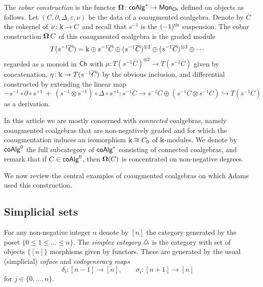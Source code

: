 The \textit{cobar construction} is the functor $\operatorname{\mathbf{\Omega}} \colon \mathsf{coAlg}^* \to \mathsf{Mon}_{\mathsf{Ch}}$ defined on objects as follows.
Let $(C, \partial, \Delta, \varepsilon, \nu)$ be the data of a coaugmented coalgebra.
Denote by $\overline{C}$ the cokernel of $\nu \colon \Bbbk \to C$ and recall that $s^{-1}$ is the $(-1)^\mathrm{th}$ suspension.
The cobar construction $\operatorname{\mathbf{\Omega}} C$ of this coaugmented coalgebra is the graded module
\begin{equation*}
T(s^{-1} \overline{C}) = \Bbbk \oplus s^{-1}\overline{C} \oplus (s^{-1}\overline{C})^{\otimes 2} \oplus (s^{-1}\overline{C})^{\otimes 3} \oplus \cdots
\end{equation*}
regarded as a monoid in $\mathsf{Ch}$ with $\mu \colon T(s^{-1} \overline{C})^{\otimes 2} \to T(s^{-1} \overline{C})$ given by concatenation, $\eta \colon \Bbbk \to T(s^{-1} \overline{C})$ by the obvious inclusion, and differential constructed by extending the linear map
\begin{equation*}
- s^{-1} \circ \partial \circ s^{+1} \ + \ (s^{-1} \otimes s^{-1}) \circ \Delta \circ s^{+1} \colon
s^{-1} \overline{C} \to s^{-1}\overline{C} \oplus (s^{-1}\overline{C} \otimes s^{-1}\overline{C}) \hookrightarrow T(s^{-1}C)
\end{equation*}
as a derivation.

In this article we are mostly concerned with \textit{connected} coalgebras, namely coaugmented  coalgebras that are non-negatively graded and for which the coaugmentation induces an isomorphism $\Bbbk \cong C_0$ of $\Bbbk$-modules. We denote by $\mathsf{coAlg}^0$ the full subcategory of $\mathsf{coAlg}^*$ consisting of connected coalgebras, and remark that if $C \in \mathsf{coAlg}^0$, then $ \operatorname{\mathbf{\Omega}}(C)$ is concentrated on non-negative degrees.

We now review the central examples of coaugmented coalgebras on which Adams used this construction.

\subsection{Simplicial sets}

For any non-negative integer $n$ denote by $[n]$ the category generated by the poset $\{0 \leq 1 \leq \dots \leq n\}$.
The \textit{simplex category} $\triangle$ is the category with set of objects $\big\{ [n] \big\}$ morphisms given by functors.
These are generated by the usual (simplicial) \textit{coface} and \textit{codegeneracy maps}
\begin{equation*}
\delta_i \colon [n-1] \to [n], \qquad \sigma_i \colon [n+1] \to [n]
\end{equation*}
for $j \in \{0, \dots, n\}$.

